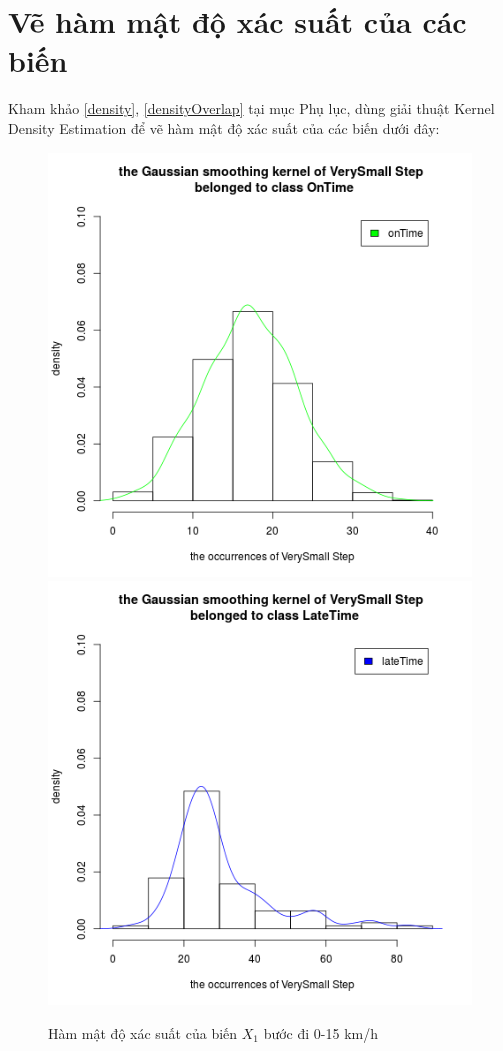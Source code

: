 \documentclass[a4paper, 13pt]{report}
\begin{document}
\section{Vẽ hàm mật độ xác suất của các biến}
Kham khảo \ref{density}, \ref{densityOverlap} tại mục Phụ lục, dùng giải thuật Kernel Density Estimation để vẽ hàm mật độ xác suất của các biến dưới đây:
\FloatBarrier
\begin{figure}[!htb]
  \includegraphics[width=\linewidth]{DensityVerySmallStep_OnTime}
\endminipage
{}
  \includegraphics[width=\linewidth]{DensityVerySmallStep_LateTime}
\endminipage
\caption*{Hàm mật độ xác suất của biến $X_1$ bước đi 0-15 km/h}
\end{figure}
\end{document}
